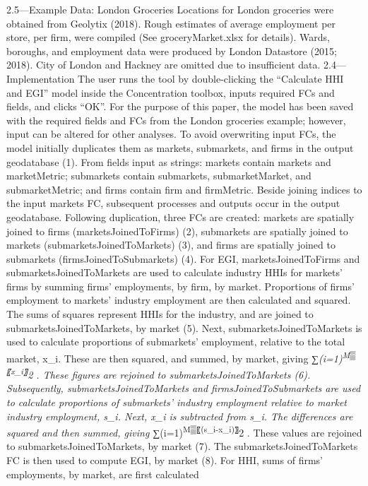 \documentclass[]{article}
\begin{document}
2.5---Example Data: London Groceries Locations for London groceries were
obtained from Geolytix (2018). Rough estimates of average employment per
store, per firm, were compiled (See groceryMarket.xlsx for details).
Wards, boroughs, and employment data were produced by London Datastore
(2015; 2018). City of London and Hackney are omitted due to insufficient
data. 2.4---Implementation The user runs the tool by double-clicking the
``Calculate HHI and EGI'' model inside the Concentration toolbox, inputs
required FCs and fields, and clicks ``OK''. For the purpose of this
paper, the model has been saved with the required fields and FCs from
the London groceries example; however, input can be altered for other
analyses. To avoid overwriting input FCs, the model initially duplicates
them as markets, submarkets, and firms in the output geodatabase (1).
From fields input as strings: markets contain markets and marketMetric;
submarkets contain submarkets, submarketMarket, and submarketMetric; and
firms contain firm and firmMetric. Beside joining indices to the input
markets FC, subsequent processes and outputs occur in the output
geodatabase. Following duplication, three FCs are created: markets are
spatially joined to firms (marketsJoinedToFirms) (2), submarkets are
spatially joined to markets (submarketsJoinedToMarkets) (3), and firms
are spatially joined to submarkets (firmsJoinedToSubmarkets) (4). For
EGI, marketsJoinedToFirms and submarketsJoinedToMarkets are used to
calculate industry HHIs for markets' firms by summing firms'
employments, by firm, by market. Proportions of firms' employment to
markets' industry employment are then calculated and squared. The sums
of squares represent HHIs for the industry, and are joined to
submarketsJoinedToMarkets, by market (5). Next,
submarketsJoinedToMarkets is used to calculate proportions of
submarkets' employment, relative to the total market, x\_i. These are
then squared, and summed, by market, giving
∑\emph{(i=1)\textsuperscript{M▒〖x\_i〗}2 . These figures are rejoined
to submarketsJoinedToMarkets (6). Subsequently,
submarketsJoinedToMarkets and firmsJoinedToSubmarkets are used to
calculate proportions of submarkets' industry employment relative to
market industry employment, s\_i. Next, x\_i is subtracted from s\_i.
The differences are squared and then summed, giving
∑}(i=1)\textsuperscript{M▒〖(s\_i-x\_i)〗}2 . These values are rejoined
to submarketsJoinedToMarkets, by market (7). The
submarketsJoinedToMarkets FC is then used to compute EGI, by market (8).
For HHI, sums of firms' employments, by market, are first calculated
\end{document}
